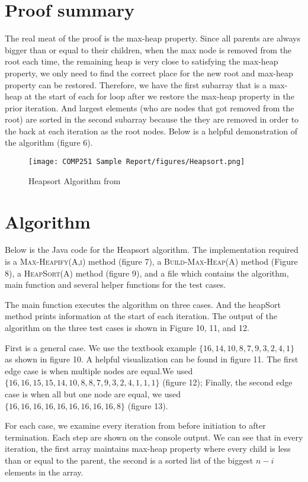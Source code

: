 \documentclass[12pt]{article}
\begin{document}
\section*{Proof summary}
The real meat of the proof is the max-heap property. Since all parents are always bigger than or equal to their children, when the max node is removed from the root each time, the remaining heap is very close to satisfying the max-heap property, we only need to find the correct place for the new root and max-heap property can be restored. Therefore, we have the first subarray that is a max-heap at the start of each for loop after we restore the max-heap property in the prior iteration. And largest elements (who are nodes that got removed from the root) are sorted in the second subarray because the they are removed in order to the back at each iteration as the root nodes. Below is a helpful demonstration of the algorithm (figure 6).  

\begin{figure}[h]
  \centering
    \texttt{[image: COMP251 Sample Report/figures/Heapsort.png]}
        \caption{Heapsort Algorithm from \cite{cormen2009introduction}}
\end{figure}

\section*{Algorithm}
Below is the Java code for the Heapsort algorithm. The implementation required is a \textsc{Max-Heapify(A,i)} method (figure 7), a \textsc{Build-Max-Heap(A)} method (Figure 8), a \textsc{HeapSort(A)} method (figure 9), and a file which contains the algorithm, main function and several helper functions for the test cases.

The main function executes the algorithm on three cases. And the heapSort method prints information at the start of each iteration. The output of the algorithm on the three test cases is shown in Figure 10, 11, and 12.

First is a general case. We use the textbook example $\{16,14,10,8,7,9,3,2,4,1\}$ as shown in figure 10. A helpful visualization can be found in figure 11. The first edge case is when multiple nodes are equal.We used $\{16,16,15,15,14,10,8,8,7,9,3,2,4,1,1,1\}$ (figure 12); Finally, the second edge case is when all but one node are equal, we used $\{16,16,16,16,16,16,16,16,16,8\}$ (figure 13).

For each case, we examine every iteration from before initiation to after termination. Each step are shown on the console output. We can see that in every iteration, the first array maintains max-heap property where every child is less than or equal to the parent, the second is a sorted list of the biggest $n-i$ elements in the array. 
\end{document}
